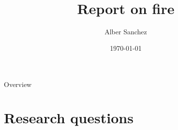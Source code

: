 \documentclass{beamer}
\title{Report on fire}
\author{Alber Sanchez}
\institute{TREES Lab - INPE}
\date{\today}
\begin{document}
\frame{\titlepage}

\begin{frame}{Overview}
    \tableofcontents
\end{frame}




\section{Research questions}
\end{document}
